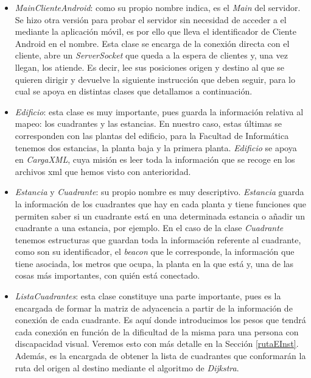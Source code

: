 \begin{itemize}
	\item \textit{MainClienteAndroid}: como su propio nombre indica, es el \textit{Main} del servidor. Se hizo otra versión para probar el servidor sin necesidad de acceder a el mediante la aplicación móvil, es por ello que lleva el identificador de Ciente Android en el nombre. Esta clase se encarga de la conexión directa con el cliente, abre un \textit{ServerSocket} que queda a la espera de clientes y, una vez llegan, los atiende. Es decir, lee sus posiciones origen y destino al que se quieren dirigir y devuelve la siguiente instrucción que deben seguir, para lo cual se apoya en distintas clases que detallamos a continuación. 
	
	\item \textit{Edificio}: esta clase es muy importante, pues guarda la información relativa al mapeo: los cuadrantes y las estancias. En nuestro caso, estas últimas se corresponden con las plantas del edificio, para la Facultad de Informática tenemos dos estancias, la planta baja y la primera planta. \textit{Edificio} se apoya en \textit{CargaXML}, cuya misión es leer toda la información que se recoge en los archivos xml que hemos visto con anterioridad.
	
	\item \textit{Estancia} y \textit{Cuadrante}: su propio nombre es muy descriptivo. \textit{Estancia} guarda la información de los cuadrantes que hay en cada planta y tiene funciones que permiten saber si un cuadrante está en una determinada estancia o añadir un cuadrante a una estancia, por ejemplo. En el caso de la clase \textit{Cuadrante} tenemos estructuras que guardan toda la información referente al cuadrante, como son su identificador, el \textit{beacon} que le corresponde, la información que tiene asociada, los metros que ocupa, la planta en la que está y, una de las cosas más importantes, con quién está conectado. 
	
	\item \textit{ListaCuadrantes}: esta clase constituye una parte importante, pues es la encargada de formar la matriz de adyacencia a partir de la información de conexión de cada cuadrante. Es aquí donde introducimos los pesos que tendrá cada conexión en función de la dificultad de la misma para una persona con discapacidad visual. Veremos esto con más detalle en la Sección \ref{rutaEInst}. Además, es la encargada de obtener la lista de cuadrantes que conformarán la ruta del origen al destino mediante el algoritmo de \textit{Dijkstra}.
	

\end{itemize}
